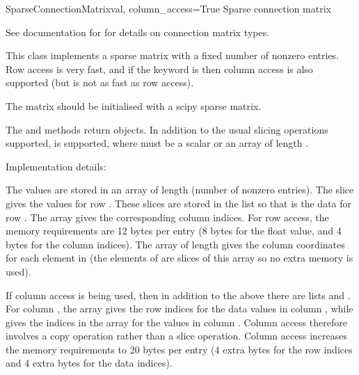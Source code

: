 \documentclass[letterpaper,10pt,english]{manual}
\begin{document}
\hypertarget{brian.SparseConnectionMatrix}{}\begin{classdesc}{SparseConnectionMatrix}{val, column\_access=True}
Sparse connection matrix

See documentation for \hyperlink{brian.ConnectionMatrix}{} for details on
connection matrix types.

This class implements a sparse matrix with a fixed number of nonzero
entries. Row access is very fast, and if the  keyword
is  then column access is also supported (but is not as fast
as row access).

The matrix should be initialised with a scipy sparse matrix.

The  and  methods return
\hyperlink{brian.SparseConnectionVector}{} objects. In addition to the
usual slicing operations supported,  is supported, where
 must be a scalar or an array of length .

Implementation details:

The values are stored in an array  of length  (number
of nonzero entries). The slice  gives
the values for row . These slices are stored in the list 
so that  is the data for row . The array 
gives the corresponding column  indices. For row access, the
memory requirements are 12 bytes per entry (8 bytes for the float value,
and 4 bytes for the column indices). The array  of length 
gives the column  coordinates for each element in  (the
elements of  are slices of this array so no extra memory is
used).

If column access is being used, then in addition to the above there are
lists  and . For column , the array
 gives the row indices for the data values in column ,
while  gives the indices in the array 
for the values in column . Column access therefore involves a
copy operation rather than a slice operation. Column access increases
the memory requirements to 20 bytes per entry (4 extra bytes for the
row indices and 4 extra bytes for the data indices).
\end{classdesc}
\end{document}

